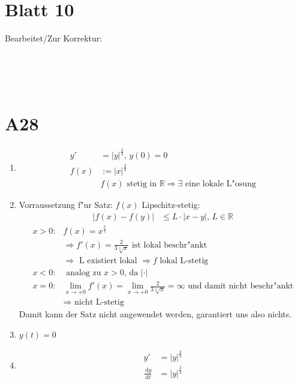 \documentclass[fleqn,12pt]{scrartcl}
\newcommand{\id}{\, \mathrm{d}}
\let\oldsqrt\sqrt
\def\sqrt{\mathpalette\DHLhksqrt}
\def\DHLhksqrt#1#2{%
	\setbox0=\hbox{$#1\oldsqrt{#2\,}$}\dimen0=\ht0
	\advance\dimen0-0.2\ht0
	\setbox2=\hbox{\vrule height\ht0 depth -\dimen0}%
{\box0\lower0.4pt\box2}}
\newcommand{\abs}[1]{
	\left \vert #1 \right \vert
}
\newcommand{\blattn}{Blatt 10}
\begin{document}
\section*{\blattn}
Bearbeitet/Zur Korrektur:

\noindent
\begin{Form}
	\\
	\\
	\\
\end{Form}

\section*{A28}
\begin{enumerate}
	\item
\begin{align*}
	y' &= \abs{y}^{\frac23},\, y(0) = 0\\
	f(x)&:= \abs{x}^{\frac23}\\
				&f(x) \text{ stetig in } \mathbb{R} \Rightarrow \exists \text{ eine lokale L"osung}
\end{align*}
\item
	Vorraussetzung f"ur Satz: $f(x)$ Lipschitz-stetig:
	\begin{align*}
		\abs{f(x) - f(y)} &\leq L\cdot \abs{x-y},\, L \in \mathbb{R}
	\end{align*}
	\begin{align*}
																	 x > 0 :&
		f(x) = x^{\frac23} \\
		&\Rightarrow f'(x) = \frac2{3\oldsqrt[3]{x}} \text{ ist lokal beschr"ankt}\\
											  & \Rightarrow
		\text{ L existiert lokal } \Rightarrow f \text{ lokal L-stetig}\\
		x < 0 :&
		\text{ analog zu } x > 0 \text{, da }\abs{ \cdot }\\
		x = 0 :&
		\lim_{x\rightarrow +0} f'(x) = \lim_{x \rightarrow +0} \frac2{3\oldsqrt[3]{x}} = \infty \text{ und damit nicht beschr"ankt}\\
		  & \Rightarrow \text{ nicht L-stetig}
	\end{align*}
	Damit kann der Satz nicht angewendet werden, garantiert uns also nichts.
\item
	$y(t) = 0$
\item
	\begin{align*}
		y'&=\abs{y}^{\frac23}\\
		\frac{\id y}{\id t} &= \abs{y}^{\frac23}\\

\end{align*}
\end{enumerate}
\end{document}
